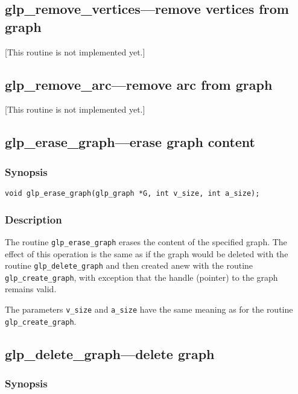 \subsection{glp\_remove\_vertices---remove vertices from graph}

[This routine is not implemented yet.]

\subsection{glp\_remove\_arc---remove arc from graph}

[This routine is not implemented yet.]

\subsection{glp\_erase\_graph---erase graph content}

\subsubsection*{Synopsis}

\begin{verbatim}
void glp_erase_graph(glp_graph *G, int v_size, int a_size);
\end{verbatim}

\subsubsection*{Description}

The routine \verb|glp_erase_graph| erases the content of the specified
graph. The effect of this operation is the same as if the graph would be
deleted with the routine \verb|glp_delete_graph| and then created anew
with the routine \verb|glp_create_graph|, with exception that the handle
(pointer) to the graph remains valid.

The parameters \verb|v_size| and \verb|a_size| have the same meaning as
for the routine \verb|glp_create_graph|.

\subsection{glp\_delete\_graph---delete graph}

\subsubsection*{Synopsis}

